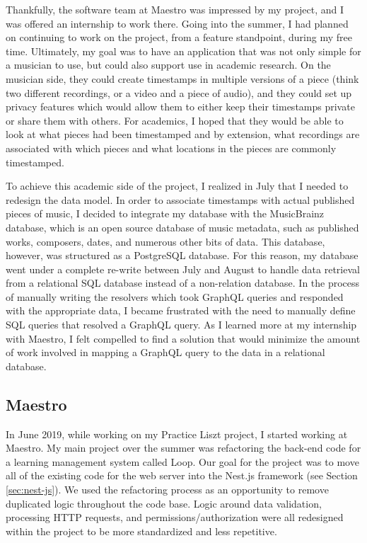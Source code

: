 Thankfully, the software team at Maestro was impressed by my project, and I was offered an internship to work there. Going into the summer, I had planned on continuing to work on the project, from a feature standpoint, during my free time.  Ultimately, my goal was to have an application that was not only simple for a musician to use, but could also support use in academic research. On the musician side, they could create timestamps in multiple versions of a piece (think two different recordings, or a video and a piece of audio), and they could set up privacy features which would allow them to either keep their timestamps private or share them with others.  For academics, I hoped that they would be able to look at what pieces had been timestamped and by extension, what recordings are associated with which pieces and what locations in the pieces are commonly timestamped.

To achieve this academic side of the project, I realized in July that I needed to redesign the data model.  In order to associate timestamps with actual published pieces of music, I decided to integrate my database with the MusicBrainz database, which is an open source database of music metadata, such as published works, composers, dates, and numerous other bits of data.  This database, however, was structured as a PostgreSQL database.  For this reason, my database went under a complete re-write between July and August to handle data retrieval from a relational SQL database instead of a non-relation database.  In the process of manually writing the resolvers which took GraphQL queries and responded with the appropriate data, I became frustrated with the need to manually define SQL queries that resolved a GraphQL query.  As I learned more at my internship with Maestro, I felt compelled to find a solution that would minimize the amount of work involved in mapping a GraphQL query to the data in a relational database.

\subsection{Maestro}
In June 2019, while working on my Practice Liszt project, I started working at Maestro. My main project over the summer was refactoring the back-end code for a learning management system called Loop.  Our goal  for the project was to move all of the existing code for the web server into the Nest.js framework (see Section \ref{sec:nest-js}).  We used the refactoring process as an opportunity to remove duplicated logic throughout the code base.  Logic around data validation, processing HTTP requests, and permissions/authorization were all redesigned within the project to be more standardized and less repetitive.

